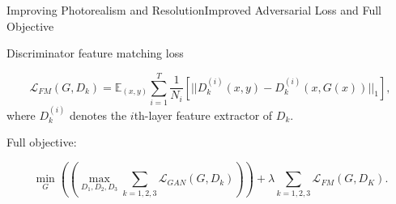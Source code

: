 \documentclass{beamer}
\begin{document}
\begin{frame}{Improving Photorealism and Resolution}{Improved Adversarial Loss and Full Objective}
%
%
\begin{beamerboxesrounded}[upper=uppercol,lower=lowercol,shadow=false]{Discriminator feature matching loss}

\begin{equation}
\mathcal{L}_{FM}(G,D_k)=\mathbb{E}_{(x,y)} \sum_{i=1}^T \frac{1}{N_i}[||D_k^{(i)}(x,y)-D_{k}^{(i)}(x,G(x))||_1],
\end{equation}
where $D_k^{(i)}$ denotes the $i$th-layer feature extractor of $D_k$.
\end{beamerboxesrounded}
%
%
\begin{beamerboxesrounded}[upper=uppercol,lower=lowercol,shadow=false]{	Full objective: }

\begin{equation}
\min_G ((\max_{D_1,D_2,D_3}\sum_{k=1,2,3} \mathcal{L}_{GAN}(G,D_k)))+\lambda \sum_{k=1,2,3}\mathcal{L}_{FM}(G,D_K).
\end{equation}
\end{beamerboxesrounded}


\end{frame}
\end{document}
